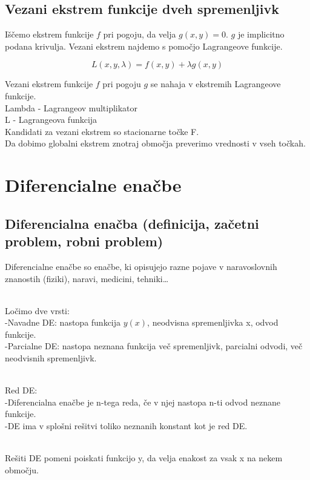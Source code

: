 \documentclass[12pt]{report}
\begin{document}
\section*{Vezani ekstrem funkcije dveh spremenljivk}

Iščemo ekstrem funkcije $f$ pri pogoju, da velja $g(x,y)=0$. $g$ je implicitno podana krivulja. Vezani ekstrem najdemo s pomočjo Lagrangeove funkcije. 

\[
L(x,y,\lambda) = f(x,y) + \lambda g(x,y)
\]

Vezani ekstrem funkcije $f$ pri pogoju $g$ se nahaja v ekstremih Lagrangeove funkcije.\\
Lambda - Lagrangeov multiplikator\\
L - Lagrangeova funkcija\\
Kandidati za vezani ekstrem so stacionarne točke F.\\ Da dobimo globalni ekstrem znotraj območja preverimo vrednosti v vseh točkah. 



\chapter*{Diferencialne enačbe}


\section*{Diferencialna enačba (definicija, začetni problem, robni problem)}

Diferencialne enačbe so enačbe, ki opisujejo razne pojave v naravoslovnih znanostih (fiziki), naravi, medicini, tehniki…\\\

Ločimo dve vrsti:\\

-Navadne DE: nastopa funkcija $y(x)$, neodvisna spremenljivka x, odvod funkcije.\\
-Parcialne DE: nastopa neznana funkcija več spremenljivk, parcialni odvodi, več neodvisnih spremenljivk. \\\

Red DE:\\
-Diferencialna enačbe je n-tega reda, če v njej nastopa n-ti odvod neznane funkcije.\\
-DE ima v splošni rešitvi toliko neznanih konstant kot je red DE.\\\

Rešiti DE pomeni poiskati funkcijo y, da velja enakost za vsak x na nekem območju.\\\
\end{document}
